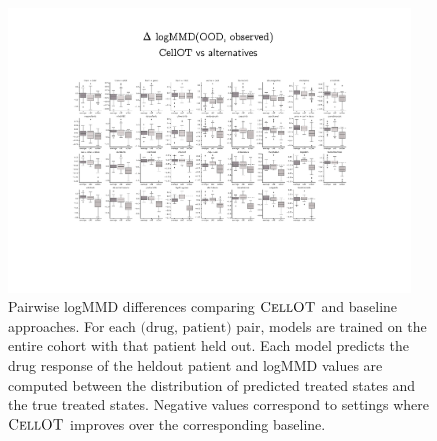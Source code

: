 \begin{figure}[h]
  \begin{center}
    \includegraphics[width=0.95\textwidth]{figures/cellot-cohort/ood-eval-logmmd.pdf}
  \end{center}
  \caption{
    Pairwise logMMD differences comparing $\textsc{CellOT}$ and baseline approaches.
    For each $\text{(drug, patient)}$ pair, models are trained on the entire cohort with that patient held out.
    Each model predicts the drug response of the heldout patient
    and logMMD values are computed between the distribution of predicted treated states and the true treated states.
    Negative values correspond to settings where $\textsc{CellOT}$ improves over the corresponding baseline.
  }
\label{fig:ood-eval-logmmd}
\end{figure}

